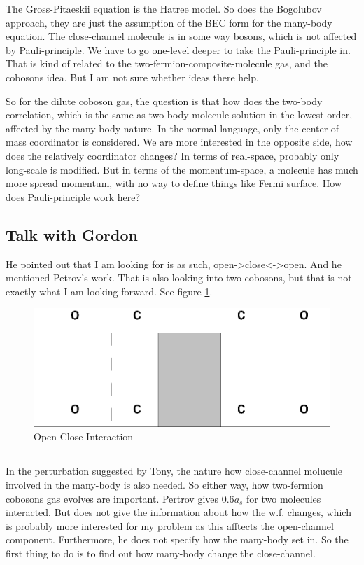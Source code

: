 The Gross-Pitaeskii equation is the Hatree model.  So does the Bogolubov approach, they are just the assumption of the BEC form for the many-body equation.  The close-channel molecule is in some way bosons, which is not affected by Pauli-principle.  We have to go one-level deeper to take the Pauli-principle in.   That is kind of related to the two-fermion-composite-molecule gas, and the cobosons idea.  But I am not sure whether ideas there \cite{cobosonPhysicsReports,CobosonCalculation} help. 


So for the dilute coboson gas, the question is that how does the two-body correlation, which is the same as two-body molecule solution in the lowest order, affected by the many-body nature.  In the normal language, only the center of mass coordinator is considered. We are more interested in the opposite side, how does the relatively coordinator changes? In terms of real-space, probably only long-scale is modified.  But in terms of the momentum-space, a molecule has much more spread momentum, with no way to define things like Fermi surface.  How does Pauli-principle work here?

\subsection{Talk with Gordon}
He pointed out that I am looking for is as such, open->close<->open. And he mentioned Petrov's work. \cite{Petrov}  That is also looking into two cobosons, but that is not exactly what I am looking forward.  See figure \ref{fig:openClose}.
\begin{figure}[htb]
	\centering
		\includegraphics[width=.50\textwidth]{image/openClose.eps}
	\caption{Open-Close Interaction\label{fig:openClose}}
	
\end{figure}

\subsection{}
In the perturbation suggested by Tony, the nature how close-channel molucule involved in the many-body is also needed.  So either way, how two-fermion cobosons gas evolves are important.  Pertrov \cite{Petrov} gives $0.6a_s$ for two molecules interacted.  But does not give the information about how the w.f. changes, which is probably more interested for my problem as this afftects the open-channel component.  Furthermore, he does not specify how the many-body set in. 
So the first thing to do is to find out how many-body change the close-channel.   
